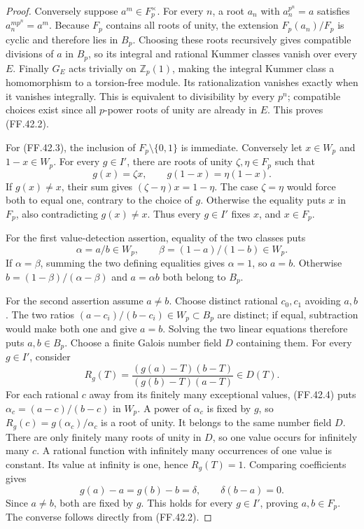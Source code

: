 \begin{proof}
Conversely suppose \(a^m\in F_p^\times\).
For every \(n\), a root \(a_n\)
with \(a_n^{p^n}=a\) satisfies
\(a_n^{mp^n}=a^m\). Because
\(F_p\) contains all roots of
unity, the extension
\(F_p(a_n)/F_p\) is cyclic and
therefore lies in \(B_p\).
Choosing these roots recursively
gives compatible divisions of \(a\)
in \(B_p\), so its integral and
rational Kummer classes vanish
over every \(E\).
Finally \(G_E\) acts trivially on
\(\mathbb Z_p(1)\), making the
integral Kummer class a homomorphism
to a torsion-free module. Its
rationalization vanishes exactly
when it vanishes integrally. This
is equivalent to divisibility by
every \(p^n\); compatible choices
exist since all \(p\)-power roots
of unity are already in \(E\).
This proves (FF.42.2).

For (FF.42.3), the inclusion of
\(F_p\setminus\{0,1\}\) is immediate.
Conversely let \(x\in W_p\) and
\(1-x\in W_p\). For every
\(g\in I'\), there are roots
of unity \(\zeta,\eta\in F_p\)
such that
\[
                    g(x)=\zeta x,\qquad
                    g(1-x)=\eta(1-x).
\]
If \(g(x)\ne x\), their sum gives
\((\zeta-\eta)x=1-\eta\).
The case \(\zeta=\eta\) would
force both to equal one, contrary
to the choice of \(g\). Otherwise
the equality puts \(x\) in \(F_p\),
also contradicting \(g(x)\ne x\).
Thus every \(g\in I'\) fixes
\(x\), and \(x\in F_p\).

For the first value-detection assertion,
equality of the two classes puts
\[
                 \alpha=a/b\in W_p,\qquad
                 \beta=(1-a)/(1-b)\in W_p.
\]
If \(\alpha=\beta\), summing the
two defining equalities gives
\(\alpha=1\), so \(a=b\).
Otherwise
\(b=(1-\beta)/(\alpha-\beta)\)
and \(a=\alpha b\) both belong
to \(B_p\).

For the second assertion assume
\(a\ne b\). Choose distinct
rational \(c_0,c_1\) avoiding
\(a,b\). The two ratios
\((a-c_i)/(b-c_i)\in W_p\subset B_p\)
are distinct; if equal, subtraction
would make both one and give
\(a=b\). Solving the two linear
equations therefore puts
\(a,b\in B_p\).
Choose a finite Galois number field
\(D\) containing them. For every
\(g\in I'\), consider
\[
 R_g(T)=\frac{(g(a)-T)(b-T)}{(g(b)-T)(a-T)}
                                 \in D(T).
                                                        \tag{FF.42.9}
\]
For each rational \(c\) away
from its finitely many exceptional
values, (FF.42.4) puts
\(\alpha_c=(a-c)/(b-c)\) in
\(W_p\). A power of \(\alpha_c\)
is fixed by \(g\), so
\(R_g(c)=g(\alpha_c)/\alpha_c\)
is a root of unity. It belongs
to the same number field \(D\).
There are only finitely many roots
of unity in \(D\), so one value
occurs for infinitely many \(c\).
A rational function with infinitely
many occurrences of one value is
constant. Its value at infinity
is one, hence \(R_g(T)=1\).
Comparing coefficients gives
\[
              g(a)-a=g(b)-b=\delta,\qquad
              \delta(b-a)=0.
\]
Since \(a\ne b\), both are
fixed by \(g\). This holds
for every \(g\in I'\), proving
\(a,b\in F_p\). The converse
follows directly from (FF.42.2).
\end{proof}

